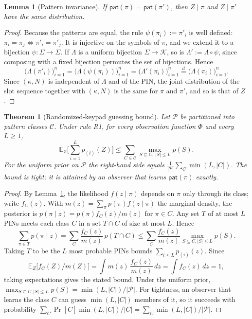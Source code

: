 \documentclass[11pt]{article}
\newtheorem{theorem}{Theorem}
\newtheorem{lemma}{Lemma}
\theoremstyle{remark}
\begin{document}
\begin{lemma}[Pattern invariance]
\label{lem:pattern}
If $\mathsf{pat}(\pi) = \mathsf{pat}(\pi')$, then $Z \mid \pi$ and $Z \mid \pi'$ have the same distribution.
\end{lemma}
\begin{proof}
Because the patterns are equal, the rule $\psi(\pi_i) := \pi'_i$ is well defined: $\pi_i = \pi_j \Leftrightarrow \pi'_i = \pi'_j$. It is injective on the symbols of $\pi$, and we extend it to a bijection $\psi: \Sigma \to \Sigma$. If $\Lambda$ is a uniform bijection $\Sigma \to \mathcal{K}$, so is $\Lambda' := \Lambda \circ \psi$, since composing with a fixed bijection permutes the set of bijections. Hence
\[
\big(\Lambda(\pi'_i)\big)_{i=1}^n = \big(\Lambda(\psi(\pi_i))\big)_{i=1}^n = \big(\Lambda'(\pi_i)\big)_{i=1}^n \overset{d}{=} \big(\Lambda(\pi_i)\big)_{i=1}^n.
\]
Since $(\kappa, N)$ is independent of $\Lambda$ and of the PIN, the joint distribution of the slot sequence together with $(\kappa, N)$ is the same for $\pi$ and $\pi'$, and so is that of $Z$.
\end{proof}

\begin{theorem}[Randomized-keypad guessing bound]
\label{thm:rand}
Let $\mathcal{P}$ be partitioned into pattern classes $\mathcal{C}$. Under rule R1, for every observation function $\Phi$ and every $L \ge 1$,
\[
\mathbb{E}_Z\Big[\sum_{i=1}^{L} p_{(i)}(Z)\Big] \le \sum_{C \in \mathcal{C}} \max_{S \subseteq C,\ |S| \le L} p(S).
\]
For the uniform prior on $\mathcal{P}$ the right-hand side equals $\frac{1}{|\mathcal{P}|}\sum_{C} \min(L, |C|)$. The bound is tight: it is attained by an observer that learns $\mathsf{pat}(\pi)$ exactly.
\end{theorem}
\begin{proof}
By Lemma~\ref{lem:pattern}, the likelihood $f(z\mid\pi)$ depends on $\pi$ only through its class; write $f_C(z)$. With $m(z) = \sum_{\pi} p(\pi) f(z\mid\pi)$ the marginal density, the posterior is $p(\pi\mid z) = p(\pi) f_C(z)/m(z)$ for $\pi \in C$. Any set $T$ of at most $L$ PINs meets each class $C$ in a set $T \cap C$ of size at most $L$. Hence
\[
\sum_{\pi \in T} p(\pi\mid z) = \sum_{C} \frac{f_C(z)}{m(z)}\, p(T \cap C) \le \sum_{C} \frac{f_C(z)}{m(z)} \max_{S\subseteq C, |S|\le L} p(S).
\]
Taking $T$ to be the $L$ most probable PINs bounds $\sum_{i\le L} p_{(i)}(z)$. Since
\[
\mathbb{E}_Z\big[f_C(Z)/m(Z)\big] = \int m(z)\,\frac{f_C(z)}{m(z)}\,dz = \int f_C(z)\,dz = 1,
\]
taking expectations gives the stated bound. Under the uniform prior, $\max_{S\subseteq C,|S|\le L} p(S) = \min(L,|C|)/|\mathcal{P}|$. For tightness, an observer that learns the class $C$ can guess $\min(L,|C|)$ members of it, so it succeeds with probability $\sum_C \Pr[C]\min(L,|C|)/|C| = \sum_C \min(L,|C|)/|\mathcal{P}|$.
\end{proof}
\end{document}
